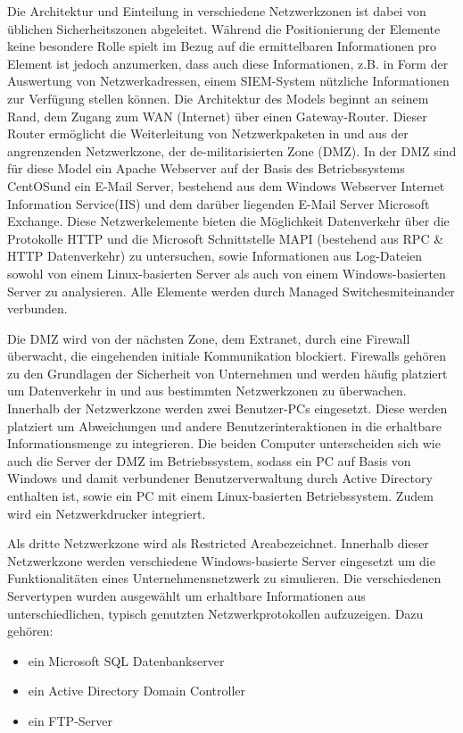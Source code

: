 Die Architektur und Einteilung in verschiedene Netzwerkzonen ist dabei von üblichen Sicherheitszonen abgeleitet. Während die Positionierung der Elemente keine besondere Rolle spielt im Bezug auf die ermittelbaren Informationen pro Element ist jedoch anzumerken, dass auch diese Informationen, z.B. in Form der Auswertung von Netzwerkadressen, einem SIEM-System nützliche Informationen zur Verfügung stellen können. Die Architektur des Models beginnt an seinem \glqq Rand\grqq , dem Zugang zum WAN (Internet) über einen Gateway-Router. Dieser Router ermöglicht die Weiterleitung von Netzwerkpaketen in und aus der angrenzenden Netzwerkzone, der de-militarisierten Zone (DMZ). 
In der DMZ sind für diese Model ein Apache Webserver auf der Basis des Betriebssystems \glqq CentOS\grqq  und ein E-Mail Server, bestehend aus dem Windows Webserver \glqq Internet Information Service\grqq  (IIS) und dem darüber liegenden E-Mail Server \glqq Microsoft Exchange\grqq . Diese Netzwerkelemente bieten die Möglichkeit Datenverkehr über die Protokolle HTTP und die Microsoft Schnittstelle MAPI (bestehend aus RPC \& HTTP Datenverkehr) zu untersuchen, sowie Informationen aus Log-Dateien sowohl von einem Linux-basierten Server als auch von einem Windows-basierten Server zu analysieren. Alle Elemente werden durch \glqq Managed Switches\grqq  miteinander verbunden.

Die DMZ wird von der nächsten Zone, dem Extranet, durch eine Firewall überwacht, die eingehenden initiale Kommunikation blockiert. Firewalls gehören zu den Grundlagen der Sicherheit von Unternehmen und werden häufig platziert um Datenverkehr in und aus bestimmten Netzwerkzonen zu überwachen. Innerhalb der Netzwerkzone werden zwei Benutzer-PCs eingesetzt. Diese werden platziert um Abweichungen und andere Benutzerinteraktionen in die erhaltbare Informationsmenge zu integrieren. Die beiden Computer unterscheiden sich wie auch die Server der DMZ im Betriebssystem, sodass ein PC auf Basis von Windows und damit verbundener Benutzerverwaltung durch Active Directory enthalten ist, sowie ein PC mit einem Linux-basierten Betriebssystem. Zudem wird ein Netzwerkdrucker integriert.

Als dritte Netzwerkzone wird als \glqq Restricted Area\grqq  bezeichnet. Innerhalb dieser Netzwerkzone werden verschiedene Windows-basierte Server eingesetzt um die Funktionalitäten eines Unternehmensnetzwerk zu simulieren. Die verschiedenen Servertypen wurden ausgewählt um erhaltbare Informationen aus unterschiedlichen, typisch genutzten Netzwerkprotokollen aufzuzeigen. Dazu gehören: 
\begin{itemize}
\item ein Microsoft SQL Datenbankserver 
\item ein Active Directory Domain Controller 
\item ein FTP-Server
\end{itemize}

